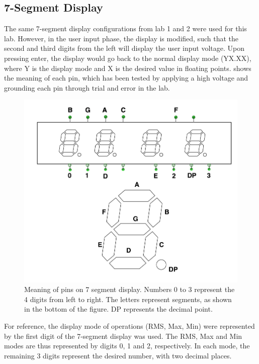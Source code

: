 \documentclass[a4paper,titlepage]{article}
\begin{document}
\subsection{7-Segment Display}
The same 7-segment display configurations from lab 1 and 2 were used for this lab. However, in the user input phase, the display is modified, such that the second and third digits from the left will display the user input voltage. Upon pressing enter, the display would go back to the normal display mode (YX.XX), where Y is the display mode and X is the desired value in floating points.  shows the meaning of each pin, which has been tested by applying a high voltage and grounding each pin through trial and error in the lab.
\begin{figure}[!htb]
  \centering
  \includegraphics[width=\columnwidth]{figures/7seg_display.PNG}
  \caption
  {Meaning of pins on 7 segment display. Numbers 0 to 3 represent the 4 digits from left to right. The letters represent segments, as shown in the bottom of the figure. DP represents the decimal point.}
  \label{fig:7_segment}
\end{figure}

For reference, the display mode of operations (RMS, Max, Min) were represented by the first digit of the 7-segment display was used. The RMS, Max and Min modes are thus represented by digits 0, 1 and 2, respectively. In each mode, the remaining 3 digits represent the desired number, with two decimal places.
\end{document}
